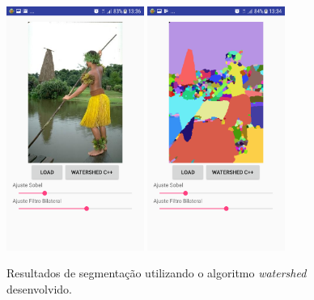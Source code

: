 \begin{figure}[!htb]
 \centering
 \def\baselinestretch{1}\small\normalsize
 \includegraphics[width=0.4\textwidth]{img/imagem_watershed_desenvolvido_app_n3.png}\qquad
 \includegraphics[width=0.4\textwidth]{img/resultado_watershed_desenvolvido_app_n3.png} 
 \caption{\label{fig:resultado_watershed_desenvolvido_app_p3}Resultados de segmentação utilizando o algoritmo \textit{watershed} desenvolvido.}
\end{figure}
